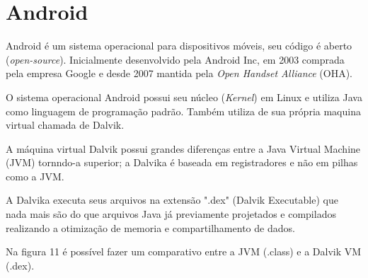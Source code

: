 \section{Android}
\label{sec:Android}
Android é um sistema operacional para dispositivos móveis, seu código é aberto (\textit{open-source}). Inicialmente desenvolvido pela Android Inc, em 2003 comprada pela empresa Google e desde 2007 mantida pela \textit{Open Handset Alliance} (OHA).

O sistema operacional Android possui seu núcleo (\textit{Kernel}) em Linux e utiliza Java como linguagem de programação padrão. Também utiliza de sua própria maquina virtual chamada de Dalvik.

A máquina virtual Dalvik possui grandes diferenças entre a Java Virtual Machine (JVM) tornndo-a superior; a Dalvika é baseada em registradores e não em pilhas como a JVM.

A Dalvika executa seus arquivos na extensão ".dex" (Dalvik Executable) que nada mais são do que arquivos Java já previamente projetados e compilados realizando a otimização de memoria e compartilhamento de dados.

Na figura 11 é possível fazer um comparativo entre a JVM (.class) e a Dalvik VM (.dex). \cite{desa}

\pagebreak
\begin{figure}[h!]
		\centering
	\end{figure}

